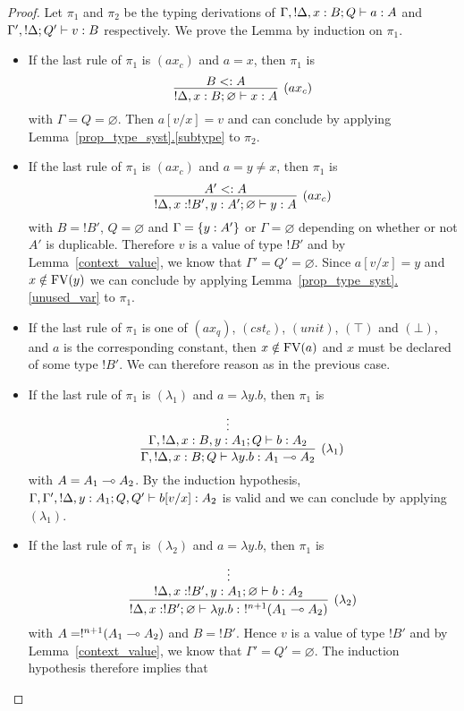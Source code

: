 \documentclass[twoside]{article}
\begin{document}
\begin{proof}
Let $\pi_1$ and $\pi_2$ be the typing derivations  of 
$\Gamma,!\Delta,x:B;Q \vdash a:A$ and  $\Gamma',!\Delta;Q' \vdash v:B$ 
respectively. We prove the Lemma by induction on $\pi_1$.
\begin{itemize}
 \item If the last rule of $\pi_1$ is $(ax_c)$ and $a=x$, then $\pi_1$ is
 \[
   \infer[(ax_c)]{!\Delta, x:B;\varnothing\entails x:A}{
     B<:A
   }
 \]
 with $\Gamma=Q=\varnothing$. Then $a[v/x]=v$ and can conclude by applying 
 Lemma~\hyperref[subtype]{\ref*{prop_type_syst}.\ref*{subtype}} to $\pi_2$.
 \item If the last rule of $\pi_1$ is $(ax_c)$ and $a=y\neq x$, then 
 $\pi_1$ is
 \[
   \infer[(ax_c)]{!\Delta, x:!B',y:A';\varnothing\entails y:A}{
     A'<:A
   }
 \]
 with $B=!B'$, $Q=\varnothing$ and $\Gamma =\{y:A'\}$ or $\Gamma=\varnothing$ 
 depending on whether or not $A'$ is duplicable. Therefore $v$ is a value of 
 type $!B'$ and by Lemma~\hyperref[context_value]{\ref*{context_value}}, 
 we know that $\Gamma'=Q'=\varnothing$. Since $a[v/x]=y$ and $x\notin \mathop{\textrm{FV}}\nolimits(y)$ 
 we can conclude by applying
 Lemma~\hyperref[unused_var]{\ref*{prop_type_syst}.\ref*{unused_var}} to $\pi_1$.
 \item If the last rule of $\pi_1$ is one of $(ax_q)$, $(cst_c)$, 
 $(unit)$, $(\top)$ and $(\bot)$, and $a$ is the corresponding constant, 
 then $x\notin \mathop{\textrm{FV}}\nolimits(a)$ and  $x$ must be declared of some type $!B'$.
 We can therefore reason as in the previous case. 
 \item If the last rule of $\pi_1$ is $(\lambda_1)$ and $a=\lambda y.b$, then $\pi_1$ is
  \[
   \infer[(\lambda_1)]{\Gamma,!\Delta,x:B;Q\entails \lambda y.b:A_1\loli A_2}{
     \deduce[]{\Gamma, !\Delta,x:B,y:A_1;Q \entails b:A_2}{
       \vdots
     }
   }
 \]
 with $A=A_1\multimap A_2$. By the induction hypothesis, 
 $\Gamma, \Gamma',!\Delta,y:A_1;Q,Q' \vdash b[v/x]:A_2$ is valid and we can conclude
 by applying $(\lambda_1)$.
 \item If the last rule of $\pi_1$ is $(\lambda_2)$ and $a=\lambda y.b$, 
 then $\pi_1$ is
 \[
  \infer[(\lambda_2)]{!\Delta, x:!B';\varnothing \entails \lambda y.b:~!^{n+1}(A_1\loli A_2)}{
    \deduce[]{!\Delta, x:!B',y:A_1;\varnothing \entails b:A_2}{
      \vdots
    }
  }
 \]
 with $A=!^{n+1}(A_1\multimap A_2)$ and $B=!B'$. Hence $v$ is a value of type $!B'$ and  
 by Lemma~\hyperref[context_value]{\ref*{context_value}}, we know that
 $\Gamma'=Q'=\varnothing$. The induction hypothesis therefore implies that

\end{itemize}
\end{proof}
\end{document}
